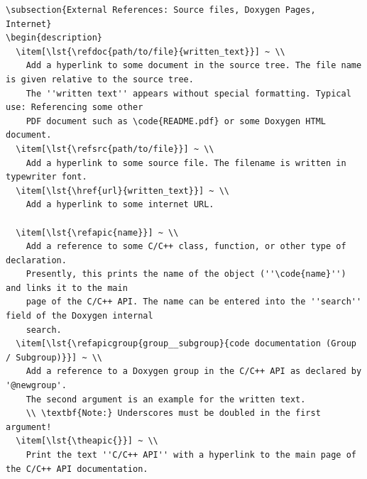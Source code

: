 \documentclass[12pt,english,parskip=half,headheight=19pt]{scrreprt}
\newcommand{\lst}[1]{\colorbox{lstbackground}{\footnotesize\code{#1}}}
\newcommand{\refdoc}[2]{\href{#1}{#2}}              %
\newcommand{\refsrc}[1]{\href{#1}{\texttt{#1}}}     %
\newcommand{\refapic}[1]{\href{home2l-api_c/index.html}{\mbox{\texttt{#1}}}}            %
\newcommand{\refapicgroup}[2]{\href{home2l-api_c/group__#1.html}{#2}}
\newcommand{\theapic}{\refdoc{home2l-api_c/index.html}{C/C++ API}}
\begin{document}
\begin{description}
{\begin{lstlisting}[language=<language>]
% External references (Doxygen and sources) ...
\subsection{External References: Source files, Doxygen Pages, Internet}
\begin{description}
  \item[\lst{\refdoc{path/to/file}{written_text}}] ~ \\
    Add a hyperlink to some document in the source tree. The file name is given relative to the source tree.
    The ''written text'' appears without special formatting. Typical use: Referencing some other
    PDF document such as \code{README.pdf} or some Doxygen HTML document.
  \item[\lst{\refsrc{path/to/file}}] ~ \\
    Add a hyperlink to some source file. The filename is written in typewriter font.
  \item[\lst{\href{url}{written_text}}] ~ \\
    Add a hyperlink to some internet URL.

  \item[\lst{\refapic{name}}] ~ \\
    Add a reference to some C/C++ class, function, or other type of declaration.
    Presently, this prints the name of the object (''\code{name}'') and links it to the main
    page of the C/C++ API. The name can be entered into the ''search'' field of the Doxygen internal
    search.
  \item[\lst{\refapicgroup{group__subgroup}{code documentation (Group / Subgroup)}}] ~ \\
    Add a reference to a Doxygen group in the C/C++ API as declared by '@newgroup'.
    The second argument is an example for the written text.
    \\ \textbf{Note:} Underscores must be doubled in the first argument!
  \item[\lst{\theapic{}}] ~ \\
    Print the text ''C/C++ API'' with a hyperlink to the main page of the C/C++ API documentation.


\end{lstlisting}}
\end{description}
\end{document}
